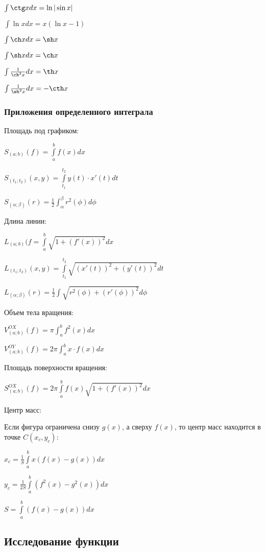 $ \int \ctg x dx = \ln|\sin x| $

$ \int \ln x dx = x(\ln x -1) $

$ \int \ch x dx = \sh x $

$ \int \sh x dx = \ch x $

$ \int \frac{1}{\ch^2 x} dx = \th x $

$ \int \frac{1}{\sh^2 x} dx = -\cth x $

\subsubsection{Приложения определенного интеграла}

Площадь под графиком:

$ S_{(a; b)}(f) = \int\limits_a^b f(x) dx $

$ S_{(t_1; t_2)}(x, y) = \int\limits_{t_1}^{t_2} y(t)\cdot x'(t) dt $ 

$ S_{(\alpha; \beta)}(r) = \frac{1}{2} \int_\alpha^\beta r^2(\phi) d\phi $

Длина линии:

$ L_{(a;b)}(f = \int\limits_a^b \sqrt{1+(f'(x))^2} dx $

$ L_{(t_1; t_2)}(x, y) = \int\limits_{t_1}^{t_2} \sqrt{(x'(t))^2+(y'(t))^2} dt $

$ L_{(\alpha; \beta)}(r) = \frac{1}{2} \int \sqrt{r^2(\phi) + (r'(\phi))^2} d\phi $

Объем тела вращения:

$ V^{OX}_{(a; b)}(f) = \pi \int_a^b f^2(x) dx $

$ V^{OY}_{(a; b)}(f) = 2\pi \int_a^b x\cdot f(x) dx $

Площадь поверхности вращения:

$ S^{OX}_{(a;b)}(f) = 2\pi \int\limits_a^b f(x)\sqrt{1+(f'(x))^2} dx $

Центр масс:

Если фигура ограничена снизу $g(x)$, а сверху $f(x)$, то центр масс находится в точке $C(x_c, y_c)$:

$ x_c = \frac{1}{S} \int\limits_a^b x(f(x)-g(x)) dx $

$ y_c = \frac{1}{2S} \int\limits_a^b (f^2(x)-g^2(x)) dx $

$ S = \int\limits_a^b (f(x)-g(x)) dx  $

\subsection{Исследование функции}

